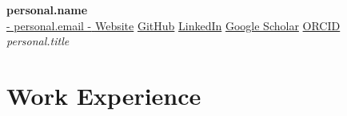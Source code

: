 \documentclass[11pt,a4paper]{article}
\begin{document}
\begin{center}
  {\LARGE\bfseries {{ personal.name }}}\\[3pt]
  {\small
    \href{mailto:{{ personal.email }}}{ {{- personal.email -}} } \textperiodcentered{}
    \href{ {{- personal.website -}} }{Website} \textperiodcentered{}
    \href{ {{- personal.github -}} }{GitHub} \textperiodcentered{}
    \href{ {{- personal.linkedin -}} }{LinkedIn} \textperiodcentered{}
    \href{ {{- personal.scholar -}} }{Google Scholar} \textperiodcentered{}
    \href{ {{- personal.orcid -}} }{ORCID}%
  }\\[5pt]
  \textit{ {{ personal.title }} }
\end{center}

\section{Work Experience}
\end{document}
